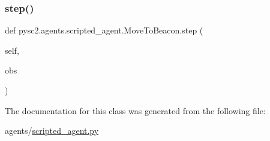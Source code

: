 \subsubsection{\texorpdfstring{step()}{step()}}
{\footnotesize\ttfamily def pysc2.\+agents.\+scripted\+\_\+agent.\+Move\+To\+Beacon.\+step (\begin{DoxyParamCaption}\item[{}]{self,  }\item[{}]{obs }\end{DoxyParamCaption})}



The documentation for this class was generated from the following file\+:\begin{DoxyCompactItemize}
\item 
agents/\mbox{\hyperlink{scripted__agent_8py}{scripted\+\_\+agent.\+py}}\end{DoxyCompactItemize}
